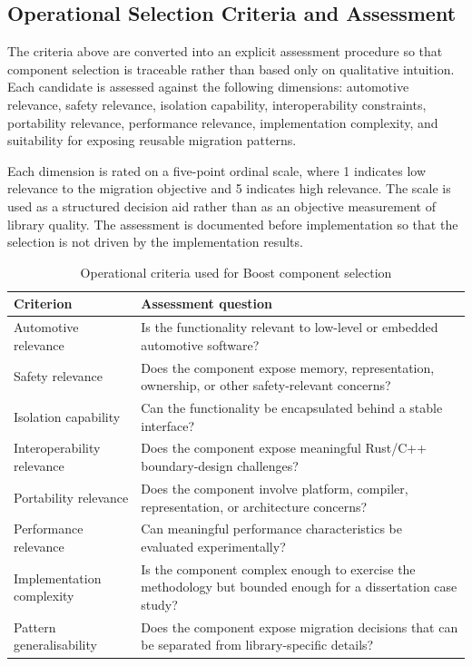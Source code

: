         \subsection{Operational Selection Criteria and Assessment}
        \label{sec:selection_assessment}

        The criteria above are converted into an explicit assessment procedure so that component selection is traceable rather than based only on qualitative intuition. Each candidate is assessed against the following dimensions: automotive relevance, safety relevance, isolation capability, interoperability constraints, portability relevance, performance relevance, implementation complexity, and suitability for exposing reusable migration patterns.

        Each dimension is rated on a five-point ordinal scale, where 1 indicates low relevance to the migration objective and 5 indicates high relevance. The scale is used as a structured decision aid rather than as an objective measurement of library quality. The assessment is documented before implementation so that the selection is not driven by the implementation results.

        \begin{table}[H]
        \centering
        \renewcommand{\arraystretch}{1.2}
        \begin{tabularx}{\textwidth}{|l|X|}
        \hline
        \textbf{Criterion} & \textbf{Assessment question} \\ \hline
        Automotive relevance & Is the functionality relevant to low-level or embedded automotive software? \\ \hline
        Safety relevance & Does the component expose memory, representation, ownership, or other safety-relevant concerns? \\ \hline
        Isolation capability & Can the functionality be encapsulated behind a stable interface? \\ \hline
        Interoperability relevance & Does the component expose meaningful Rust/C++ boundary-design challenges? \\ \hline
        Portability relevance & Does the component involve platform, compiler, representation, or architecture concerns? \\ \hline
        Performance relevance & Can meaningful performance characteristics be evaluated experimentally? \\ \hline
        Implementation complexity & Is the component complex enough to exercise the methodology but bounded enough for a dissertation case study? \\ \hline
        Pattern generalisability & Does the component expose migration decisions that can be separated from library-specific details? \\ \hline
        \end{tabularx}
        \caption{Operational criteria used for Boost component selection}
        \label{tab:selection_criteria}
        \end{table}

